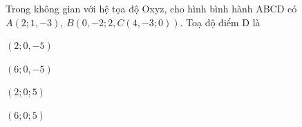 \begin{question}[type=multiple_choice,difficulty=2,code={I-10}]
Trong không gian với hệ tọa độ Oxyz, cho hình bình hành ABCD có $ A(2;1,-3) $, $ B(0,-2;2,C(4,-3;0)) $. Toạ độ điểm D là

\begin{choice}[label=A]
$ (2;0,-5) $
\end{choice}

\begin{choice}[correct,label=B]
$ (6;0,-5) $
\end{choice}

\begin{choice}[label=C]
$ (2;0;5) $
\end{choice}

\begin{choice}[label=D]
$ (6;0;5) $
\end{choice}

\end{question}